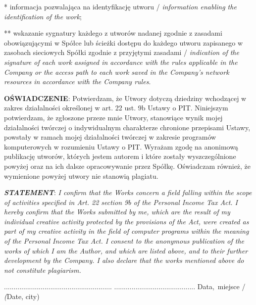 \documentclass[10pt]{report}
\begin{document}
\begin{ThreePartTable}
		\begin{tablenotes}
			\item[*] informacja pozwalająca na identyfikację utworu / \textit{information enabling the identification of the work};
			\item[**] wskazanie sygnatury każdego z utworów nadanej zgodnie z zasadami obowiązującymi w Spółce lub ścieżki dostępu do każdego utworu zapisanego w zasobach sieciowych Spółki zgodnie z przyjętymi zasadami / \textit{indication of the signature of each work assigned in accordance with the rules applicable in the Company or the access path to each work saved in the Company's network resources in accordance with the Company rules}.
		\end{tablenotes}
	\end{ThreePartTable}
	
	\vspace{1 \baselineskip}
	
	{\textbf{OŚWIADCZENIE}:} {\normalsize Potwierdzam, że Utwory dotyczą dziedziny wchodzącej w zakres działalności określonej w art. 22 ust. 9b Ustawy o PIT. Niniejszym potwierdzam, że zgłoszone przeze mnie Utwory, stanowiące wynik mojej działalności twórczej o indywidualnym charakterze chronione przepisami Ustawy, powstały w ramach mojej działalności twórczej w zakresie programów komputerowych w rozumieniu Ustawy o PIT. Wyrażam zgodę na anonimową publikację utworów, których jestem autorem i które zostały wyszczególnione powyżej oraz na ich dalsze opracowywanie przez Spółkę. Oświadczam również, że wymienione powyżej utwory nie stanowią plagiatu.}\newline
	
	{\textit{\textbf{STATEMENT}}:} {\small \textit{I confirm that the Works concern a field falling within the scope of activities specified in Art. 22 section 9b of the Personal Income Tax Act. I hereby confirm that the Works submitted by me, which are the result of my individual creative activity protected by the provisions of the Act, were created as part of my creative activity in the field of computer programs within the meaning of the Personal Income Tax Act. I consent to the anonymous publication of the works of which I am the Author, and which are listed above, and to their further development by the Company. I also declare that the works mentioned above do not constitute plagiarism.}}\newline
	
	\vspace*{\fill}
	\noindent ........................................................ \hfill ..........................................\newline
	 \hfill {\small Data, miejsce / \textit(Date, city)}
\end{document}

